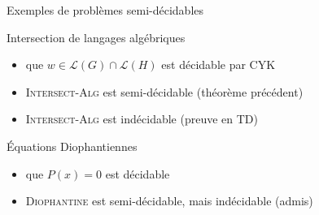 
\begingroup

\begin{frame}{Exemples de problèmes semi-décidables}

  \vspace{-2mm}
  \begin{block}{Intersection de langages algébriques}

  \vspace{-2mm}

  \vspace{-2mm}
    \begin{itemize}
    \item {} que $w \in \mathcal{L}(G) \cap \mathcal{L}(H)$ est \alert{décidable} par CYK
    \item \textsc{Intersect-Alg} est \alert{semi-décidable} (théorème précédent)
    \item \textsc{Intersect-Alg} est \alert{indécidable} (preuve en TD)
    \end{itemize}
  \end{block}

  \vspace{-2mm}
  \begin{block}{Équations Diophantiennes}

  \vspace{-2mm}

  \vspace{-2mm}
    \begin{itemize}
    \item {} que $P(x) = 0$ est \alert{décidable}
    \item \textsc{Diophantine} est \alert{semi-décidable}, mais \alert{indécidable} (admis)
    \end{itemize}
  \end{block}
  
\end{frame}

\endgroup
\endinput
